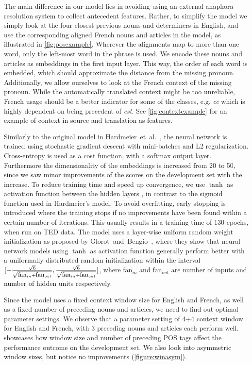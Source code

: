 \documentclass[11pt]{article}
\begin{document}
The main difference in our model lies in avoiding using an external anaphora resolution system to collect antecedent features.
Rather, to simplify the model we simply look at the four closest previous nouns and determiners in English, and use the corresponding aligned French nouns and articles in the model, as illustrated in \cref{fig:posexample}.
Wherever the alignments map to more than one word, only the left-most word in the phrase is used.
We encode these nouns and articles as embeddings in the first input layer. This way, the order of each word is embedded, which should approximate the distance from the missing pronoun.
Additionally, we allow ourselves to look at the French context of the missing pronoun.
While the automatically translated context might be too unreliable, French usage should be a better indicator for some of the classes, e.g. \emph{ce} which is highly dependent on being precedent of \emph{est}.
See \cref{fig:contextexample} for an example of context in source and translation as features.

Similarly to the original model in Hardmeier~et~al.~, the neural network is trained using stochastic gradient descent with mini-batches and L2 regularization.
Cross-entropy is used as a cost function, with a softmax output layer.
Furthermore the dimensionality of the embeddings is increased from 20 to 50, since we saw minor improvements of the scores on the development set with the increase.
To reduce training time and speed up convergence, we use $\tanh$ as activation function between the hidden layers \cite{Lecun2012Efficient}, in contrast to the sigmoid function used in Hardmeier's model.
To avoid overfitting, early stopping is introduced where the training stops if no improvements have been found within a certain number of iterations.
This usually results in a training time of 130 epochs, when run on TED data.
The model uses a layer-wise uniform random weight initialization as proposed by Glorot~and~Bengio~, where they show that neural network models using $\tanh$ as activation function generally perform better with a uniformally distributed random initialization within the interval $[-\frac{\sqrt{6}}{\sqrt{\mbox{\small fan}_{in}+\mbox{\small fan}_{out}}},\frac{\sqrt{6}}{\sqrt{\mbox{\small fan}_{in}+\mbox{\small fan}_{out}}}]$, where $\mbox{fan}_{in}$ and $\mbox{fan}_{out}$ are number of inputs and number of hidden units respectively.

Since the model uses a fixed context window size for English and French, as well as a fixed number of preceding nouns and articles, we need to find out optimal parameter settings. We observe that a parameter setting of 4+4 context window for English and French, with 3 preceding nouns and articles each perform well.  showcases how window size and number of preceding POS tags affect the performance outcome on the development set. We also look into asymmetric window sizes, but notice no improvements (\cref{figure:winasym}).
\end{document}
